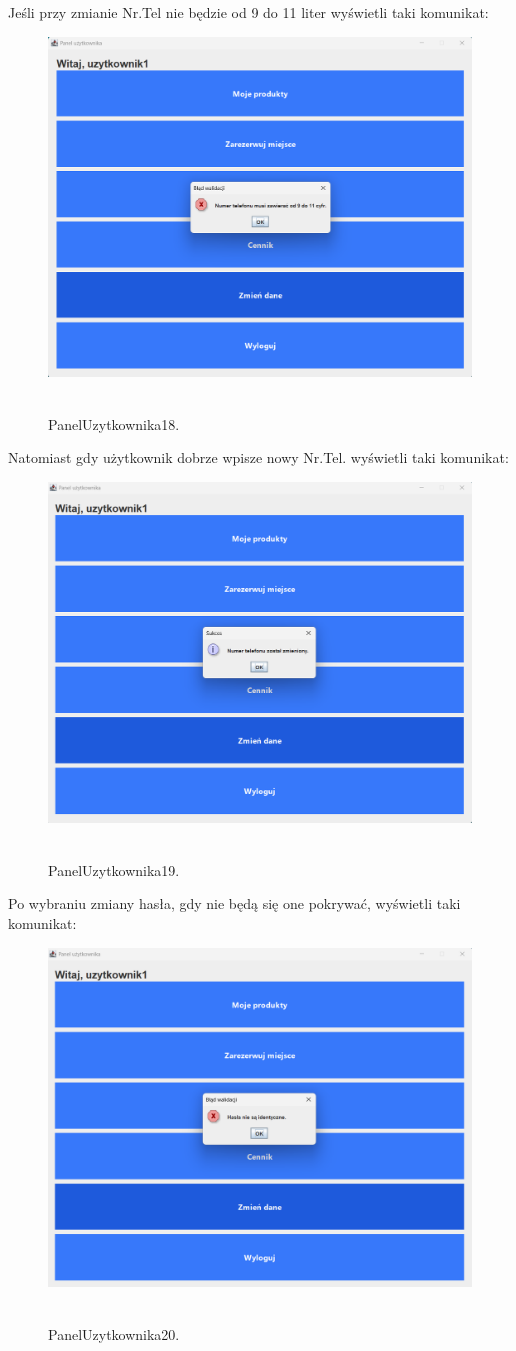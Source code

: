 Jeśli przy zmianie Nr.Tel nie będzie od 9 do 11 liter wyświetli taki komunikat:
\begin{figure}[H]
    \centering
    \includegraphics[width=.7\linewidth]{figures/PanelUzytkownika18.png}\
    \caption{PanelUzytkownika18.\label{PanelUzytkownika18}}
\end{figure}
Natomiast gdy użytkownik dobrze wpisze nowy Nr.Tel. wyświetli taki komunikat:
\begin{figure}[H]
    \centering
    \includegraphics[width=.7\linewidth]{figures/PanelUzytkownika19.png}\
    \caption{PanelUzytkownika19.\label{PanelUzytkownika19}}
\end{figure}
Po wybraniu zmiany hasła, gdy nie będą się one pokrywać, wyświetli taki komunikat:
\begin{figure}[H]
    \centering
    \includegraphics[width=.7\linewidth]{figures/PanelUzytkownika20.png}\
    \caption{PanelUzytkownika20.\label{PanelUzytkownika20}}
\end{figure}
